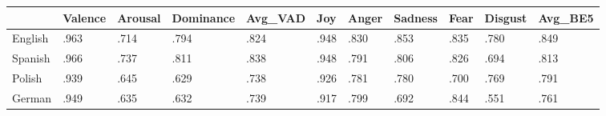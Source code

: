 \begin{tabular}{lllllllllll}
\toprule
{} & Valence & Arousal & Dominance & Avg\_VAD &  Joy & Anger & Sadness & Fear & Disgust & Avg\_BE5 \\
\midrule
English &    .963 &    .714 &      .794 &    .824 & .948 &  .830 &    .853 & .835 &    .780 &    .849 \\
Spanish &    .966 &    .737 &      .811 &    .838 & .948 &  .791 &    .806 & .826 &    .694 &    .813 \\
Polish  &    .939 &    .645 &      .629 &    .738 & .926 &  .781 &    .780 & .700 &    .769 &    .791 \\
German  &    .949 &    .635 &      .632 &    .739 & .917 &  .799 &    .692 & .844 &    .551 &    .761 \\
\bottomrule
\end{tabular}

